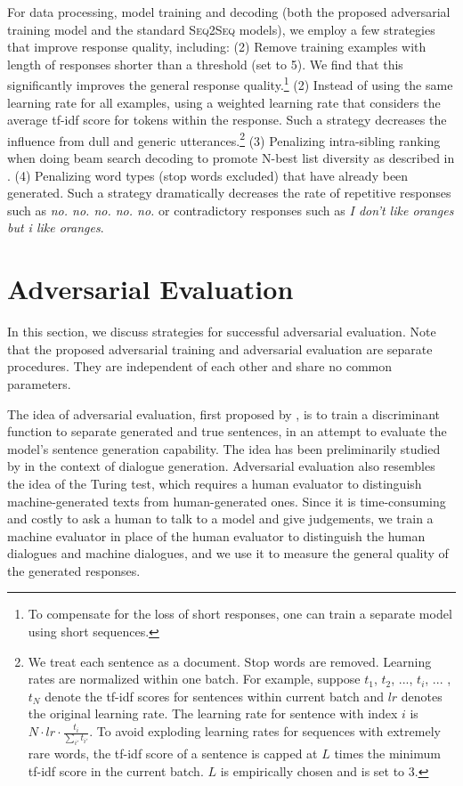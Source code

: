 \documentclass[11pt]{article}
\newcommand{\sts}{{{\textsc{Seq2Seq}}}\xspace}
\begin{document}
For 
data processing, 
model training and decoding  (both the proposed adversarial training model and the standard \sts models), we employ a few  strategies that  improve response quality, including: 
(2) Remove training examples with length of responses shorter than a threshold (set to 5).
We find that this significantly improves the general response quality.\footnote{To compensate for the loss of short responses, one can train a separate model using short sequences.}
(2) Instead of using the same learning rate for all examples, using a weighted learning rate that considers the average tf-idf score for tokens within the response.
Such a strategy
 decreases the influence from dull and generic utterances.\footnote{We treat each sentence as a document. Stop words are removed.
 Learning rates are normalized within one batch. 
 For example, suppose $t_1$, $t_2$, ..., $t_i$, ... ,$t_N$ denote the tf-idf scores for  sentences within current batch and $lr$ denotes the original learning rate. The learning rate for sentence with index $i$ is $N\cdot lr\cdot \frac{t_i}{\sum_{i'}t_{i'}}$. 
 To avoid exploding learning rates for sequences with extremely rare words, the tf-idf score of a sentence 
 is capped at $L$ times the minimum tf-idf score in the current batch. $L$ is empirically chosen and is set to 3.
  } (3) Penalizing intra-sibling ranking when doing beam search decoding to promote N-best list diversity as described in .  (4) Penalizing word types (stop words excluded) that have already been generated. Such a strategy dramatically decreases the rate of repetitive responses such as {\it no. no. no. no. no.} or contradictory responses such as {\it I don't like oranges but i like oranges}. 

\section{Adversarial Evaluation}
In this section, we discuss strategies for successful adversarial evaluation. 
Note that the proposed adversarial training and adversarial evaluation 
are separate procedures. 
They are independent of each other and share no common parameters. 


 The idea of adversarial evaluation, first proposed by 
, is to 
train a discriminant
function
 to separate  generated and
true sentences, in an attempt to evaluate the model's sentence generation capability.
The idea has been preliminarily studied by  in the context of dialogue generation. 
Adversarial evaluation  also resembles the idea of the Turing test,
which requires a human evaluator 
to distinguish  machine-generated texts from human-generated ones. 
Since it is time-consuming and costly to 
 ask a human to talk to a model 
and give judgements,
we  train a machine evaluator
in place of the  human evaluator to distinguish the human dialogues and machine dialogues, and we use it to measure 
 the general quality of the generated responses. 
\end{document}
